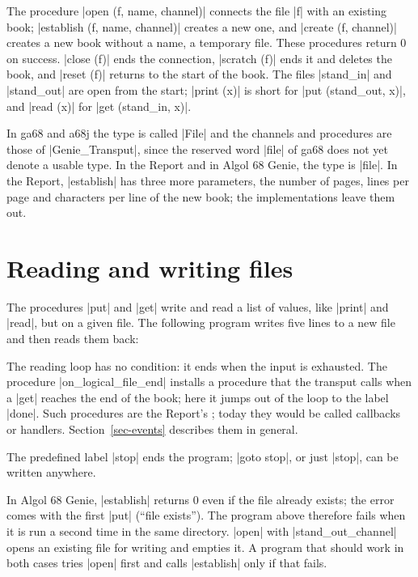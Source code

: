 The procedure \code|open (f, name, channel)| connects the file
\code|f| with an existing book; \code|establish (f, name, channel)|
creates a new one, and \code|create (f, channel)| creates a new book
without a name, a temporary file. These procedures return 0 on success.
\code|close (f)| ends the connection, \code|scratch (f)| ends it and
deletes the book, and \code|reset (f)| returns to the start of the
book. The files \code|stand_in| and \code|stand_out| are open from the
start; \code|print (x)| is short for \code|put (stand_out, x)|, and
\code|read (x)| for \code|get (stand_in, x)|.

\begin{implnote}
In ga68 and a68j the type is called \code|File| and the channels and
procedures are those of \code|Genie_Transput|, since the reserved word
\code|file| of ga68 does not yet denote a usable type. In the Report and
in Algol 68 Genie, the type is \code|file|. In the Report,
\code|establish| has three more parameters, the number of pages, lines
per page and characters per line of the new book; the implementations
leave them out.
\end{implnote}

\section{Reading and writing files}\label{sec-get-put}

The procedures \code|put| and \code|get| write and read a list of values,
like \code|print| and \code|read|, but on a given file. The following
program writes five lines to a new file and then reads them back:


The reading loop has no condition: it ends when the input is exhausted.
The procedure \code|on_logical_file_end| installs a procedure that the
transput calls when a \code|get| reaches the end of the book; here it
jumps out of the loop to the label \code|done|. Such procedures are the
Report's ; today they would be called callbacks or
handlers. Section~\ref{sec-events} describes them in general.

The predefined label \code|stop| ends the program; \code|goto stop|, or
just \code|stop|, can be written anywhere.

\begin{implnote}
In Algol 68 Genie, \code|establish| returns 0 even if the file already
exists; the error comes with the first \code|put| (``file exists''). The
program above therefore fails when it is run a second time in the same
directory. \code|open| with \code|stand_out_channel| opens an existing
file for writing and empties it. A program that should work in both cases
tries \code|open| first and calls \code|establish| only if that fails.
\end{implnote}


